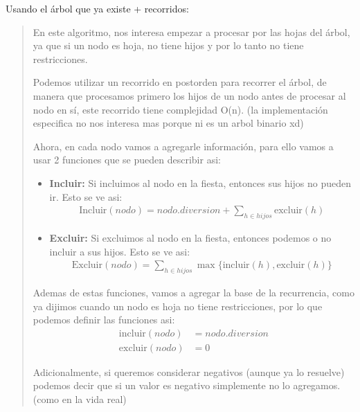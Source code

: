\textcolor{bibi}{Usando el árbol que ya existe + recorridos:} \vspace{.2cm}
\begin{quote}
    En este algoritmo, nos interesa empezar a procesar por las hojas del árbol, ya que si un nodo es hoja, no tiene hijos y por lo tanto no tiene restricciones. \vspace{.2cm}

    Podemos utilizar un recorrido en postorden para recorrer el árbol, de manera que procesamos primero los hijos de un nodo antes de procesar al nodo en sí, este recorrido tiene complejidad O(n). (la implementación especifica no nos interesa mas porque ni es un arbol binario xd) \vspace{.2cm}

    Ahora, en cada nodo vamos a agregarle información, para ello vamos a usar 2 funciones que se pueden describir asi: \vspace{.2cm}
    \begin{itemize}
        \item \textbf{Incluir:} Si incluimos al nodo en la fiesta, entonces sus hijos no pueden ir. Esto se ve asi:
        \begin{align*}
            \text{Incluir}(nodo) = nodo.diversion +\sum_{h \in hijos} \text{excluir}(h)
        \end{align*}
        \item \textbf{Excluir:} Si excluimos al nodo en la fiesta, entonces podemos o no incluir a sus hijos. Esto se ve asi: 
        \begin{align*}
            \text{Excluir}(nodo) = \sum_{h \in hijos} \max\{\text{incluir}(h), \text{excluir}(h)\}
        \end{align*}
    \end{itemize}

    Ademas de estas funciones, vamos a agregar la base de la recurrencia, como ya dijimos cuando un nodo es hoja no tiene restricciones, por lo que podemos definir las funciones asi: \vspace{.2cm}
    \begin{align*}
        \text{incluir}(nodo) &= nodo.diversion \\
        \text{excluir}(nodo) &= 0
    \end{align*}

    Adicionalmente, si queremos considerar negativos (aunque ya lo resuelve) podemos decir que si un valor es negativo simplemente no lo agregamos. (como en la vida real) \vspace{.2cm}


\end{quote}
